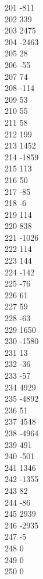 { 201	-811 \\
 202	339 \\
 203	2475 \\
 204	-2463 \\
 205	28 \\
 206	-55 \\
 207	74 \\
 208	-114 \\
 209	53 \\
 210	55 \\
 211	58 \\
 212	199 \\
 213	1452 \\
 214	-1859 \\
 215	113 \\
 216	50 \\
 217	-85 \\
 218	-6 \\
 219	114 \\
 220	838 \\
 221	-1026 \\
 222	114 \\
 223	144 \\
 224	-142 \\
 225	-76 \\
 226	61 \\
 227	59 \\
 228	-63 \\
 229	1650 \\
 230	-1580 \\
 231	13 \\
 232	-36 \\
 233	-57 \\
 234	4929 \\
 235	-4892 \\
 236	51 \\
 237	4548 \\
 238	-4964 \\
 239	491 \\
 240	-501 \\
 241	1346 \\
 242	-1355 \\
 243	82 \\
 244	-86 \\
 245	2939 \\
 246	-2935 \\
 247	-5 \\
 248	0 \\
 249	0 \\
 250	0 \\
}
